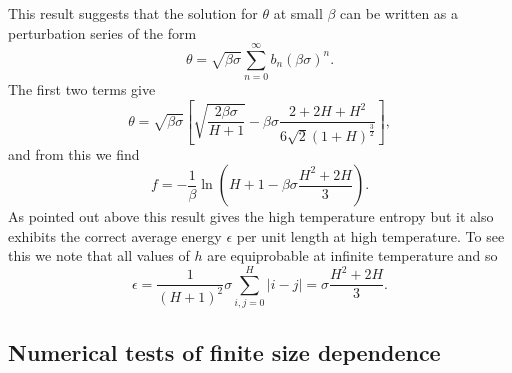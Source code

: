 This result suggests that the solution for $\theta$ at small $\beta$ can be written as a perturbation series of the form
\begin{equation}
\theta = \sqrt{\beta\sigma}\sum_{n=0}^\infty b_n (\beta\sigma)^n.
\end{equation}
The first two terms give
\begin{equation}
\theta = \sqrt{\beta\sigma}\left[\sqrt{\frac{2\beta\sigma}{H+1}} -\beta\sigma \frac{2 + 2H +H^2}{6\sqrt{2}(1+H)^{\frac{3}{2}}}\right],
\end{equation}
and from this we find
\begin{equation}
f=-\frac{1}{\beta}\ln(H+1-\beta\sigma\frac{H^2+2H}{3}).
\end{equation}
As pointed out above this result gives the high temperature entropy but it also exhibits the correct average energy $\epsilon$ per unit length at high temperature. To see this we note that all values of $h$ are equiprobable at infinite temperature and so
\begin{equation}
\epsilon = \frac{1}{(H+1)^2}\sigma \sum_{i,j=0}^H |i-j| =\sigma\frac{H^2+2H}{3}.
\end{equation}
\subsection{Numerical tests of finite size dependence}
